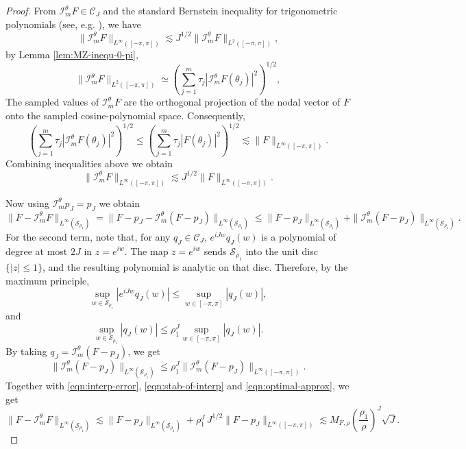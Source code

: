 \documentclass{article}
\numberwithin{equation}{section}
\def\lt{\left}
\def\rt{\right}
\def\mI{\mathcal{I}}
\begin{document}
\begin{proof}
    
    From $\mathcal{I}_m^\theta F\in \mathcal{C}_J$ and the standard Bernstein inequality for trigonometric polynomials (see, e.g. \cite[Chapter 4]{devore1993constructive}), we have
    $$
        \|\mI_m^\theta F \|_{L^\infty([-\pi,\pi])}\lesssim J^{1/2} \|\mI_m^\theta F \|_{L^2([-\pi,\pi])},
    $$
    by Lemma \ref{lem:MZ-inequ-0-pi},
    $$\|\mI_m^\theta F \|_{L^2([-\pi,\pi])}\simeq \lt( \sum_{j=1}^m \tau_j |\mI_m^\theta F(\theta_j)|^2 \rt)^{1/2},$$
    The sampled values of $\mathcal I_m^\theta F$ are the orthogonal projection of the nodal vector of $F$ onto the sampled cosine-polynomial space. Consequently,
    $$\lt( \sum_{j=1}^m \tau_j |\mI_m^\theta F(\theta_j)|^2 \rt)^{1/2}\leq \lt( \sum_{j=1}^m \tau_j |F(\theta_j)|^2 \rt)^{1/2}\lesssim \|F\|_{L^\infty([-\pi,\pi])}.$$
    Combining inequalities above we obtain
    \begin{equation}\label{eqn:stab-of-interp}
        \|\mI_m^\theta F \|_{L^\infty([-\pi,\pi])}\lesssim J^{1/2} \|F \|_{L^\infty([-\pi,\pi])}.
    \end{equation}

    Now using $\mI_m^\theta p_J = p_J$ we obtain
    \begin{equation}\label{eqn:interp-error}
        \|F-\mI_m^\theta F\|_{L^\infty(\mathcal{S}_{\rho_1})} = \|F-p_J - \mI_m^\theta (F-p_J)\|_{L^\infty(\mathcal{S}_{\rho_1})} \leq \|F-p_J\|_{L^\infty(\mathcal{S}_{\rho_1})} + \|\mI_m^\theta (F-p_J)\|_{L^\infty(\mathcal{S}_{\rho_1})}.
    \end{equation}
    For the second term, note that, for any $q_J\in\mathcal{C}_J$, $e^{iJw}q_J(w)$ is a polynomial of degree at most $2J$ in $z=e^{iw}$. The map $z=e^{iw}$ sends $\mathcal{S}_{\rho_1}$ into the unit disc $\{|z|\leq 1\}$, and the resulting polynomial is analytic on that disc. Therefore, by the maximum principle,
    $$\sup_{w\in\mathcal{S}_{\rho_1}} |e^{iJw}q_J(w)|\leq \sup_{w\in[-\pi,\pi]}|q_J(w)|,$$
    and 
    $$\sup_{w\in\mathcal{S}_{\rho_1}} |q_J(w)|\leq \rho_1^J\sup_{w\in[-\pi,\pi]}|q_J(w)|.$$
    By taking $q_J = \mI_m^\theta(F-p_J)$, we get
    \begin{equation}
        \|\mI_m^\theta(F-p_J)\|_{L^\infty(\mathcal{S}_{\rho_1})}\leq \rho_1^J \|\mI_m^\theta(F-p_J)\|_{L^\infty([-\pi,\pi])}.
    \end{equation}
    Together with \eqref{eqn:interp-error}, \eqref{eqn:stab-of-interp} and \eqref{eqn:optimal-approx}, we get
    \begin{equation}
        \|F-\mI_m^\theta F\|_{L^\infty(\mathcal{S}_{\rho_1})} \lesssim \|F-p_J\|_{L^\infty(\mathcal{S}_{\rho_1})} + \rho_1^J\,J^{1/2}\|F-p_J\|_{L^\infty([-\pi,\pi])} \lesssim M_{F,\rho} \lt(\frac{\rho_1}{\rho}\rt)^J \sqrt J.
    \end{equation}
\end{proof}
\end{document}
